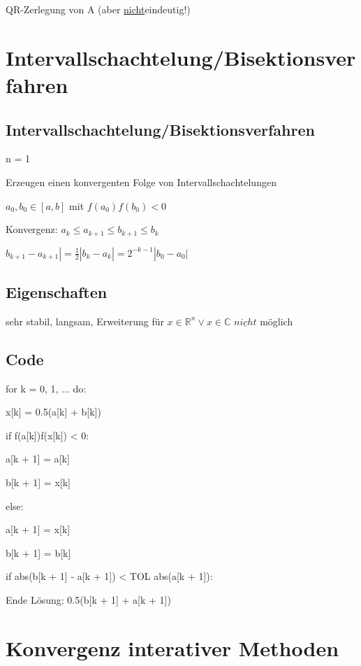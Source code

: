 \documentclass[12pt,a4paper]{article} %
\newcommand*\tab[1][1cm]{\hspace*{#1}}
\begin{document}
	QR-Zerlegung von A (aber \underline{nicht}eindeutig!)
	
	\newpage
	
	\section{Intervallschachtelung/Bisektionsverfahren}
	
	\subsection{Intervallschachtelung/Bisektionsverfahren}
	
	n = 1
	
	Erzeugen einen konvergenten Folge von Intervallschachtelungen
	
	$a_0, b_0 \in [a, b]$ mit $f(a_0)f(b_0) < 0$
	
	Konvergenz: $a_k \le a_{k + 1} \le b_{k + 1} \le b_k$
	
	$b_{k + 1} - a_{k + 1}| = \frac{1}{2}|b_k - a_k| = 2^{-k - 1}|b_0 - a_0|$
	
	\subsection{Eigenschaften}
	
	sehr stabil, langsam, Erweiterung für $x \in \mathbb{R}^n \vee x \in \mathbb{C}$ $\underline{nicht}$ möglich
	
	\subsection{Code}
	
	for k = 0, 1, ... do:
	
	\tab x[k] = 0.5(a[k] + b[k])
	
	\tab if f(a[k])f(x[k]) < 0:
	
	\tab \tab a[k + 1] = a[k]
	
	\tab \tab b[k + 1] = x[k]
	
	\tab else:
	
	\tab \tab a[k + 1] = x[k]
	
	\tab \tab b[k + 1] = b[k]
	
	\tab if abs(b[k + 1] - a[k + 1]) < TOL abs(a[k + 1]):
	
	\tab \tab Ende Lösung: 0.5(b[k + 1] + a[k + 1])
	
	\newpage
	
	\section{Konvergenz interativer Methoden}
	
\end{document}
